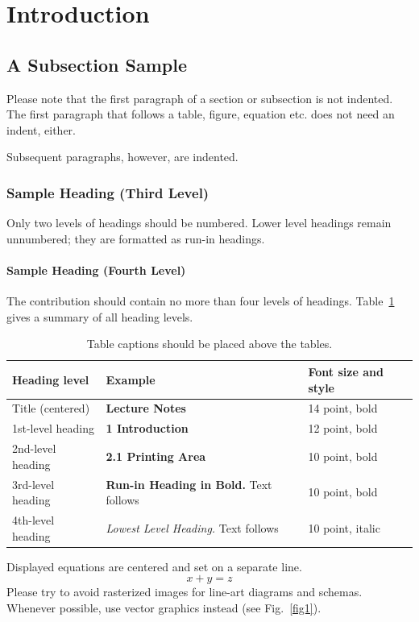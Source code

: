 \documentclass[runningheads]{llncs}
\begin{document}
\section{Introduction}
\subsection{A Subsection Sample}
Please note that the first paragraph of a section or subsection is
not indented. The first paragraph that follows a table, figure,
equation etc. does not need an indent, either.

Subsequent paragraphs, however, are indented.

\subsubsection{Sample Heading (Third Level)} Only two levels of
headings should be numbered. Lower level headings remain unnumbered;
they are formatted as run-in headings.

\paragraph{Sample Heading (Fourth Level)}
The contribution should contain no more than four levels of
headings. Table~\ref{tab1} gives a summary of all heading levels.

\begin{table}
\caption{Table captions should be placed above the
tables.}\label{tab1}
\begin{tabular}{|l|l|l|}
\hline
Heading level &  Example & Font size and style\\
\hline
Title (centered) &  {\Large\bfseries Lecture Notes} & 14 point, bold\\
1st-level heading &  {\large\bfseries 1 Introduction} & 12 point, bold\\
2nd-level heading & {\bfseries 2.1 Printing Area} & 10 point, bold\\
3rd-level heading & {\bfseries Run-in Heading in Bold.} Text follows & 10 point, bold\\
4th-level heading & {\itshape Lowest Level Heading.} Text follows & 10 point, italic\\
\hline
\end{tabular}
\end{table}


\noindent Displayed equations are centered and set on a separate
line.
\begin{equation}
x + y = z
\end{equation}
Please try to avoid rasterized images for line-art diagrams and
schemas. Whenever possible, use vector graphics instead (see
Fig.~\ref{fig1}).
\end{document}
